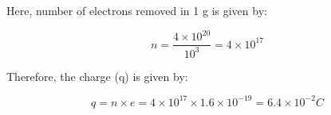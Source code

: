 Here, number of electrons removed in 1 g is given by:

\[n = \frac{4 \times 10^{20}}{10^{3}}=4 \times 10^{17}\]

Therefore, the charge (q) is given by:

\[q = n \times e = 4 \times 10^{17} \times 1.6 \times 10^{-19}=6.4 \times 10^{-2} C\]